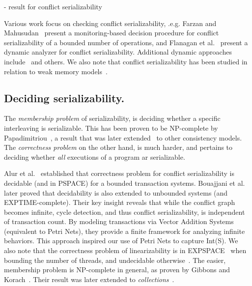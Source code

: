 - result for conflict serializability

Various work focus on checking conflict serializability, .e.g. Farzan and Mahusudan~\cite{FaMa08} present a monitoring-based decision procedure for conflict serializability of a bounded number of operations, and Flanagan et al.~\cite{FlFrYi08} present a dynamic analyzer for conflict serializability. Additional dynamic approaches include~\cite{FlFr04, XuBoRa05, WaSt06a,  CoOlPnTuZu07,EmMaMa10, SiMaWaGu11} and others.
%
%
We also note that conflict serializability has been studied in relation to weak memory models~\cite{EnFa16}.




\subsection{Deciding serializability.}
\label{sec:related:deciding-serializability}


The \textit{membership problem} of serializability, is deciding whether a specific interleaving is serializable. This has been proven to be NP-complete by Papadimitriou~\cite{Pa79}, a result that was later extended~\cite{BiEn19} to other consistency models.
%
The \textit{correctness problem} on the other hand, is much harder, and pertains to deciding whether \textit{all} executions of a program ar serializable.

%
Alur et al.~\cite{AlMcPe96} established that correctness problem for conflict serializability is decidable (and in PSPACE) for a bounded transaction systems. Bouajjani et al.~\cite{BoEmEnHa13} later proved that decidability is also extended to unbounded systems (and EXPTIME-complete). Their key insight reveals that while the conflict graph becomes infinite, cycle detection, and thus conflict serializability, is independent of transaction count. By modeling transactions via Vector Addition Systems (equivalent to Petri Nets), they provide a finite framework for analyzing infinite behaviors. This approach inspired our use of Petri Nets to capture Int(S).
%
We also note that the correctness problem of linearizability is in 
EXPSPACE~\cite{AlMcPe96} when bounding the number of threads, and undecidable 
otherwise~\cite{BoEmEnHa13}. The easier, membership problem is NP-complete in 
general, as proven by Gibbons and Korach~\cite{GiKo97}. Their result was later 
extended to \textit{collections}~\cite{EmEn18}.

